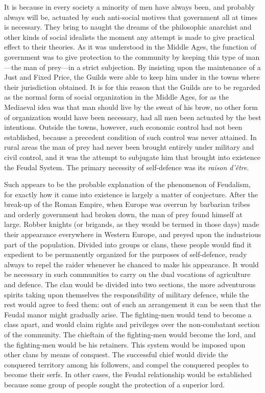 \documentclass{book}
\begin{document}
It is because in every society a minority of men have always been, and probably always will be, actuated by such anti-social motives that government all at times is necessary. They bring to naught the dreams of the philosophic anarchist and other kinds of social idealists the moment any attempt is made to give practical effect to their theories. As it was understood in the Middle Ages, the function of government was to give protection to the community by keeping this type of man—the man of prey—in a strict subjection. By insisting upon the maintenance of a Just and Fixed Price, the Guilds were able to keep him under in the towns where their jurisdiction obtained. It is for this reason that the Guilds are to be regarded as the normal form of social organization in the Middle Ages, for as the Mediaeval idea was that man should live by the sweat of his brow, no other form of organization would have been necessary, had all men been actuated by the best intentions. Outside the towns, however, such economic control had not been established, because a precedent condition of such control was never attained. In rural areas the man of prey had never been brought entirely under military and civil control, and it was the attempt to subjugate him that brought into existence the Feudal System. The primary necessity of self-defence was its \emph{raison d’être}.

Such appears to be the probable explanation of the phenomenon of Feudalism, for exactly how it came into existence is largely a matter of conjecture. After the break-up of the Roman Empire, when Europe was overrun by barbarian tribes and orderly government had broken down, the man of prey found himself at large. Robber knights (or brigands, as they would be termed in those days) made their appearance everywhere in Western Europe, and preyed upon the industrious part of the population. Divided into groups or clans, these people would find it expedient to be permanently organized for the purposes of self-defence, ready always to repel the raider whenever he chanced to make his appearance. It would be necessary in such communities to carry on the dual vocations of agriculture and defence. The clan would be divided into two sections, the more adventurous spirits taking upon themselves the responsibility of military defence, while the rest would agree to feed them: out of such an arrangement it can be seen that the Feudal manor might gradually arise. The fighting-men would tend to become a class apart, and would claim rights and privileges over the non-combatant section of the community. The chieftain of the fighting-men would become the lord, and the fighting-men would be his retainers. This system would be imposed upon other clans by means of conquest. The successful chief would divide the conquered territory among his followers, and compel the conquered peoples to become their serfs. In other cases, the Feudal relationship would be established because some group of people sought the protection of a superior lord.
\end{document}
